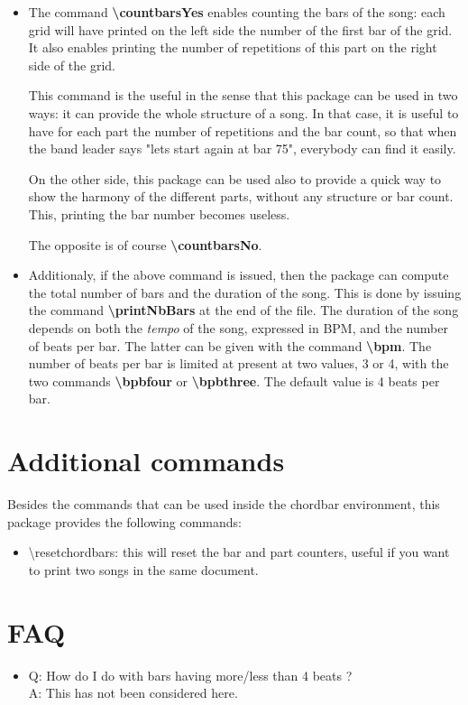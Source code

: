 \documentclass[11pt]{article}
\newcommand{\btt}{\bfseries \ttfamily }
\newcommand{\tbs}{\textbackslash{}}
\begin{document}
\begin{itemize}
\item The command {\btt \tbs countbarsYes} enables counting the bars of the song:
each grid will have printed on the left side the number of the first bar of the grid.
It also enables printing the number of repetitions of this part on the right side of the grid.

This command is the useful in the sense that this package can be used in two ways:
it can provide the whole structure of a song.
In that case, it is useful to have for each part the number of repetitions and the bar count, so that when the band leader says "lets start again at bar 75", everybody can find it easily.

On the other side, this package can be used also to provide a quick way to show the harmony of the different parts, without any structure or bar count.
This, printing the bar number becomes useless.

The opposite is of course {\btt \tbs countbarsNo}.

\item Additionaly, if the above command is issued, then the package can compute the total number of bars and the duration of the song.
This is done by issuing the command {\btt \tbs printNbBars} at the end of the file.
The duration of the song depends on both the {\em tempo} of the song, expressed in BPM, and the number of beats per bar.
The latter can be given with the command {\btt \tbs bpm}.
The number of beats per bar is limited at present at two values, 3 or 4, with the two commands
{\btt \tbs bpbfour} or {\btt \tbs bpbthree}.
The default value is 4 beats per bar.


\end{itemize}

\section{Additional commands}

Besides the commands that can be used inside the chordbar environment, this package provides the following commands:

\begin{itemize}
\item {\ttfamily \textbackslash resetchordbars}: this will reset the bar and part counters, useful if you want to print two songs in the same document.
\end{itemize}


\section{FAQ}

\begin{itemize}
\item Q: How do I do with bars having more/less than 4 beats ? \\
A: This has not been considered here.
\end{itemize}
\end{document}
